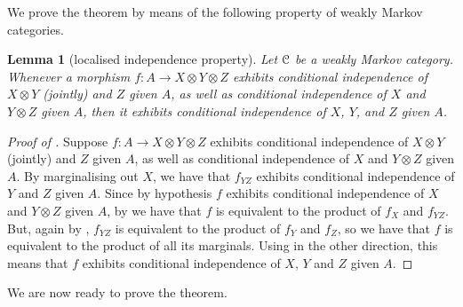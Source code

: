 \documentclass[a4paper,UKenglish,numberwithinsect,cleveref, autoref, thm-restate]{lipics-v2021}
\theoremstyle{plain} %
\newtheorem{mylemma}[mytheorem]{Lemma}
\theoremstyle{definition} %
\begin{document}
We prove the theorem by means of the following property of weakly Markov categories.

\begin{mylemma}[localised independence property]\label{local}
 Let $\mathcal{C}$ be a weakly Markov category. Whenever a morphism  $f:A\to X\otimes Y\otimes Z$ exhibits conditional independence of $X\otimes Y$ (jointly) and $Z$ given $A$, as well as conditional independence of $X$ and $Y\otimes Z$ given $A$, then it exhibits conditional independence of $X$, $Y$, and $Z$ given $A$. 
\end{mylemma}
\begin{proof}[Proof of ]
 Suppose $f:A\to X\otimes Y\otimes Z$ exhibits conditional independence of $X\otimes Y$ (jointly) and $Z$ given $A$, as well as conditional independence of $X$ and $Y\otimes Z$ given $A$.
 By marginalising out $X$, we have that $f_{YZ}$ exhibits conditional independence of $Y$ and $Z$ given $A$. 
 Since by hypothesis $f$ exhibits conditional independence of $X$ and $Y\otimes Z$ given $A$, by  we have that $f$ is equivalent to the product  of $f_X$ and $f_{YZ}$. But, again by , $f_{YZ}$ is equivalent to the product of $f_Y$ and $f_Z$, so we have that $f$ is equivalent to the product of all its marginals. Using  in the other direction, this means that $f$ exhibits conditional independence of $X$, $Y$ and $Z$ given $A$. 
\end{proof}
%
We are now ready to prove the theorem.
\end{document}
